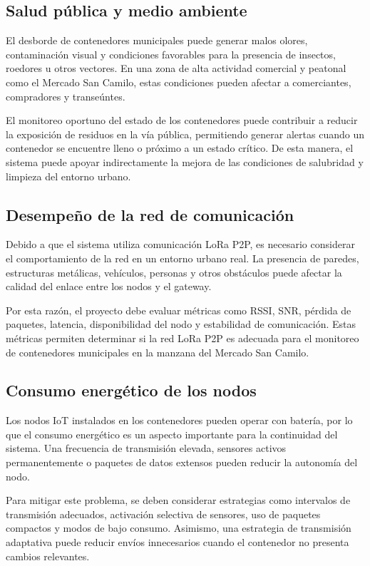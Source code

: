 \subsection{Salud pública y medio ambiente}

El desborde de contenedores municipales puede generar malos olores, contaminación visual y condiciones favorables para la presencia de insectos, roedores u otros vectores. En una zona de alta actividad comercial y peatonal como el Mercado San Camilo, estas condiciones pueden afectar a comerciantes, compradores y transeúntes.

El monitoreo oportuno del estado de los contenedores puede contribuir a reducir la exposición de residuos en la vía pública, permitiendo generar alertas cuando un contenedor se encuentre lleno o próximo a un estado crítico. De esta manera, el sistema puede apoyar indirectamente la mejora de las condiciones de salubridad y limpieza del entorno urbano.

\subsection{Desempeño de la red de comunicación}

Debido a que el sistema utiliza comunicación LoRa P2P, es necesario considerar el comportamiento de la red en un entorno urbano real. La presencia de paredes, estructuras metálicas, vehículos, personas y otros obstáculos puede afectar la calidad del enlace entre los nodos y el gateway.

Por esta razón, el proyecto debe evaluar métricas como RSSI, SNR, pérdida de paquetes, latencia, disponibilidad del nodo y estabilidad de comunicación. Estas métricas permiten determinar si la red LoRa P2P es adecuada para el monitoreo de contenedores municipales en la manzana del Mercado San Camilo.

\subsection{Consumo energético de los nodos}

Los nodos IoT instalados en los contenedores pueden operar con batería, por lo que el consumo energético es un aspecto importante para la continuidad del sistema. Una frecuencia de transmisión elevada, sensores activos permanentemente o paquetes de datos extensos pueden reducir la autonomía del nodo.

Para mitigar este problema, se deben considerar estrategias como intervalos de transmisión adecuados, activación selectiva de sensores, uso de paquetes compactos y modos de bajo consumo. Asimismo, una estrategia de transmisión adaptativa puede reducir envíos innecesarios cuando el contenedor no presenta cambios relevantes.

